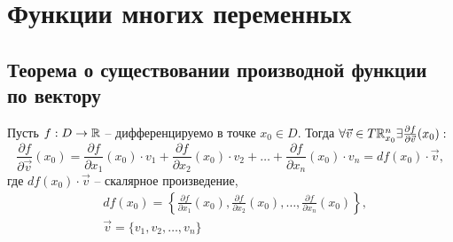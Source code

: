 \section{Функции многих переменных}

\setcounter{subsection}{1}

\subsection{Теорема о существовании производной функции по вектору}

\begin{statement}
    Пусть $ f:D\rightarrow\mathbb{R} $ -- дифференцируемо в точке $ x_0\in D $. Тогда $ \forall \vec{v}\in T\mathbb{R}_{x_0}^n \exists \frac{\partial f}{\partial \vec{v}}(x_0):$
    \[
        \frac{\partial f}{\partial \vec{v}}(x_0) = \frac{\partial f}{\partial x_1}(x_0) \cdot v_1 + \frac{\partial f}{\partial x_2}(x_0) \cdot v_2 + \ldots +\frac{\partial f}{\partial x_n}(x_0) \cdot v_n = df(x_0)\cdot \vec{v},
    \] где $df(x_0)\cdot \vec{v}$ -- скалярное произведение,
    \begin{align*}
         & df(x_0) = \left\{\frac{\partial f}{\partial x_1}(x_0), \frac{\partial f}{\partial x_2}(x_0), \ldots, \frac{\partial f}{\partial x_n}(x_0)\right\}, \\
         & \vec{v} = \{v_1,v_2,\ldots,v_n\}
    \end{align*}
\end{statement}

